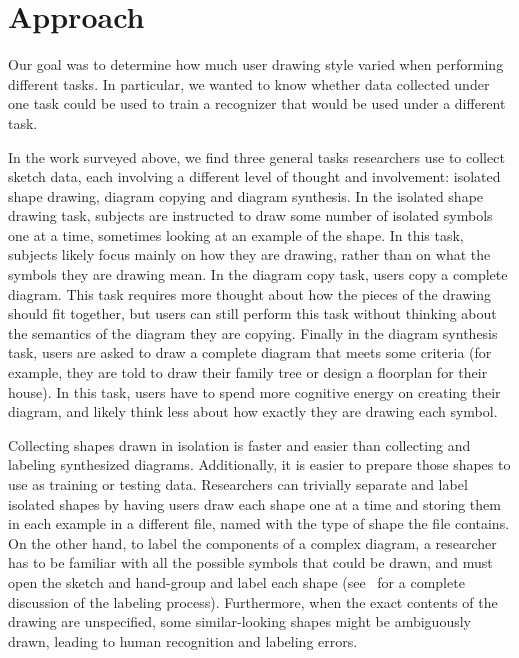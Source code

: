 \documentclass{egpubl}
\begin{document}

\section{Approach}

Our goal was to determine how much user drawing style varied when performing different tasks.  In particular, we wanted to know whether data collected under one task could be used to train a recognizer that would be used under a different task.

In the work surveyed above, we find three general tasks researchers use to collect sketch data, each involving a different level of thought and involvement: isolated shape drawing, diagram copying and diagram synthesis.  In the isolated shape drawing task, subjects are instructed to draw some number of isolated symbols one at a time, sometimes looking at an example of the shape.  In this task, subjects likely focus mainly on how they are drawing, rather than on what the symbols they are drawing mean.  In the diagram copy task, users copy a complete diagram.  This task requires more thought about how the pieces of the drawing should fit together, but users can still perform this task without thinking about the semantics of the diagram they are copying.  Finally in the diagram synthesis task, users are asked to draw a complete diagram that meets some criteria (for example, they are told to draw their family tree or design a floorplan for their house).  In this task, users have to spend more cognitive energy on creating their diagram, and likely think less about how exactly they are drawing each symbol.

Collecting shapes drawn in isolation is faster and easier than collecting and labeling synthesized diagrams. Additionally, it is easier to prepare those shapes to use as training or testing data.   Researchers can trivially separate and label isolated shapes by having users draw each shape one at a time and storing them in each example in a different file, named with the type of shape the file contains.  On the other hand, to label the components of a complex diagram, a researcher has to be familiar with all the possible symbols that could be drawn, and must open the sketch and hand-group and label each shape (see~\cite{Wolin2007Labeler} for a complete discussion of the labeling process). Furthermore, when the exact contents of the drawing are unspecified, some similar-looking shapes might be ambiguously drawn, leading to human recognition and labeling errors.
\end{document}
